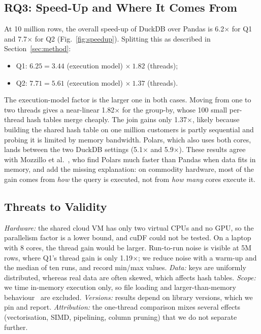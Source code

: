 \documentclass[conference,a4paper]{IEEEtran}
\begin{document}
\subsection{RQ3: Speed-Up and Where It Comes From}
At 10 million rows, the overall speed-up of DuckDB over Pandas is 6.2$\times$ for Q1 and 7.7$\times$ for Q2 (Fig.~\ref{fig:speedup}). Splitting this as described in Section~\ref{sec:method}:
\begin{itemize}
\item Q1: $6.25 = 3.44$ (execution model) $\times\ 1.82$ (threads);
\item Q2: $7.71 = 5.61$ (execution model) $\times\ 1.37$ (threads).
\end{itemize}
The execution-model factor is the larger one in both cases. Moving from one to two threads gives a near-linear 1.82$\times$ for the group-by, whose 100 small per-thread hash tables merge cheaply. The join gains only 1.37$\times$, likely because building the shared hash table on one million customers is partly sequential and probing it is limited by memory bandwidth. Polars, which also uses both cores, lands between the two DuckDB settings (5.1$\times$ and 5.9$\times$). These results agree with Mozzillo et al.~\cite{mozzillo25}, who find Polars much faster than Pandas when data fits in memory, and add the missing explanation: on commodity hardware, most of the gain comes from \emph{how} the query is executed, not from \emph{how many} cores execute it.

\subsection{Threats to Validity}
\emph{Hardware:} the shared cloud VM has only two virtual CPUs and no GPU, so the parallelism factor is a lower bound, and cuDF could not be tested. On a laptop with 8 cores, the thread gain would be larger. Run-to-run noise is visible at 5M rows, where Q1's thread gain is only 1.19$\times$; we reduce noise with a warm-up and the median of ten runs, and record min/max values. \emph{Data:} keys are uniformly distributed, whereas real data are often skewed, which affects hash tables. \emph{Scope:} we time in-memory execution only, so file loading and larger-than-memory behaviour~\cite{kuiper24,kuiper25} are excluded. \emph{Versions:} results depend on library versions, which we pin and report. \emph{Attribution:} the one-thread comparison mixes several effects (vectorisation, SIMD, pipelining, column pruning) that we do not separate further.
\end{document}

